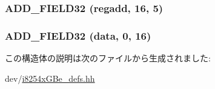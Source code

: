 \label{structiGbReg_1_1Regs_1_1MDIC_aacfd0814f3ef498c2700b64eeb082644}
\hypertarget{structiGbReg_1_1Regs_1_1MDIC_a9e85282accff6e24b2d6fd6aa264dfba}{
\subsubsection[{ADD\_\-FIELD32}]{\setlength{\rightskip}{0pt plus 5cm}ADD\_\-FIELD32 (regadd, \/  16, \/  5)}}
\label{structiGbReg_1_1Regs_1_1MDIC_a9e85282accff6e24b2d6fd6aa264dfba}
\hypertarget{structiGbReg_1_1Regs_1_1MDIC_ae1e7551607b5abdf2586f2cf8d72650d}{
\subsubsection[{ADD\_\-FIELD32}]{\setlength{\rightskip}{0pt plus 5cm}ADD\_\-FIELD32 (data, \/  0, \/  16)}}
\label{structiGbReg_1_1Regs_1_1MDIC_ae1e7551607b5abdf2586f2cf8d72650d}


この構造体の説明は次のファイルから生成されました:\begin{DoxyCompactItemize}
\item 
dev/\hyperlink{i8254xGBe__defs_8hh}{i8254xGBe\_\-defs.hh}\end{DoxyCompactItemize}
